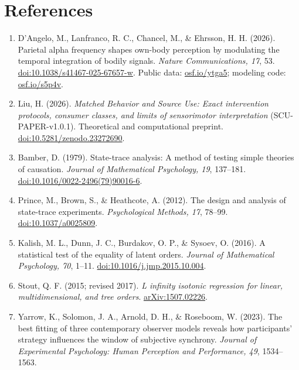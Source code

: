 \documentclass[
  11pt,
]{article}
\let\ctdoldsection\section
\renewcommand{\section}{\Needspace{8\baselineskip}\ctdoldsection}
\begin{document}
\hypertarget{references}{%
\section{References}\label{references}}

\begin{enumerate}
\def\labelenumi{\arabic{enumi}.}
\item
  D'Angelo, M., Lanfranco, R. C., Chancel, M., \& Ehrsson, H. H. (2026).
  Parietal alpha frequency shapes own-body perception by modulating the
  temporal integration of bodily signals. \emph{Nature Communications,
  17}, 53.
  \href{https://doi.org/10.1038/s41467-025-67657-w}{doi:10.1038/s41467-025-67657-w}.
  Public data: \href{https://osf.io/ytga5/}{osf.io/ytga5}; modeling
  code: \href{https://osf.io/s5p4v/}{osf.io/s5p4v}.
\item
  Liu, H. (2026). \emph{Matched Behavior and Source Use: Exact
  intervention protocols, consumer classes, and limits of sensorimotor
  interpretation} (SCU-PAPER-v1.0.1). Theoretical and computational
  preprint.
  \href{https://doi.org/10.5281/zenodo.23272690}{doi:10.5281/zenodo.23272690}.
\item
  Bamber, D. (1979). State-trace analysis: A method of testing simple
  theories of causation. \emph{Journal of Mathematical Psychology, 19},
  137--181.
  \href{https://doi.org/10.1016/0022-2496(79)90016-6}{doi:10.1016/0022-2496(79)90016-6}.
\item
  Prince, M., Brown, S., \& Heathcote, A. (2012). The design and
  analysis of state-trace experiments. \emph{Psychological Methods, 17},
  78--99. \href{https://doi.org/10.1037/a0025809}{doi:10.1037/a0025809}.
\item
  Kalish, M. L., Dunn, J. C., Burdakov, O. P., \& Sysoev, O. (2016). A
  statistical test of the equality of latent orders. \emph{Journal of
  Mathematical Psychology, 70}, 1--11.
  \href{https://doi.org/10.1016/j.jmp.2015.10.004}{doi:10.1016/j.jmp.2015.10.004}.
\item
  Stout, Q. F. (2015; revised 2017). \emph{L infinity isotonic
  regression for linear, multidimensional, and tree orders}.
  \href{https://arxiv.org/abs/1507.02226}{arXiv:1507.02226}.
\item
  Yarrow, K., Solomon, J. A., Arnold, D. H., \& Roseboom, W. (2023). The
  best fitting of three contemporary observer models reveals how
  participants' strategy influences the window of subjective synchrony.
  \emph{Journal of Experimental Psychology: Human Perception and
  Performance, 49}, 1534--1563.

\end{enumerate}
\end{document}
